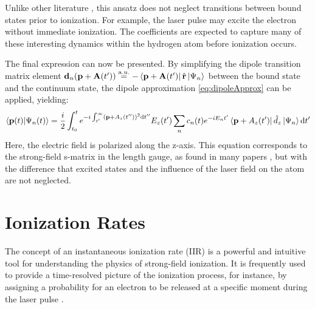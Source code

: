 Unlike other literature \cite{Theory_NPS, Ivanov20012005}, this ansatz does not neglect transitions between bound states prior to ionization.
For example, the laser pulse may excite the electron without immediate ionization.
The coefficients are expected to capture many of these interesting dynamics within the hydrogen atom before ionization occurs.

The final expression can now be presented.
By simplifying the dipole transition matrix element $\mathbf{d}_n(\mathbf{p}+\mathbf{A}(t')) \stackrel{\mathrm{a.u.}}{=} -\bra{\mathbf{p}+\mathbf{A}(t')}\hat{\mathbf{r}}\ket{\Psi_n}$ between the bound state and the continuum state, the dipole approximation \eqref{eq:dipoleApprox} can be applied, yielding:
\begin{equation}
    \braket{\mathbf{p}(t)|\Psi_n(t)} = \frac{i}{2}\int_{t_0}^{t} e^{-i \int_{t'}^{\infty} (\mathbf{p} + A_z(t''))^2 \mathrm{d} t''}E_z(t')\sum_{n}c_n(t)e^{-iE_nt'}\bra{\mathbf{p}+A_z(t')}\hat{d}_z\ket{\Psi_n} \mathrm{d} t'       \label{eq:smatrix}
\end{equation}
Here, the electric field is polarized along the z-axis.
This equation corresponds to the strong-field s-matrix in the length gauge, as found in many papers \cite{Theory_NPS, Ivanov20012005}, but with the difference that excited states and the influence of the laser field on the atom are not neglected.




\section{Ionization Rates}



The concept of an instantaneous ionization rate (IIR) is a powerful and intuitive tool for understanding the physics of strong-field ionization. It is frequently used to provide a time-resolved picture of the ionization process, for instance, by assigning a probability for an electron to be released at a specific moment during the laser pulse \cite{Ivanov2018}.

